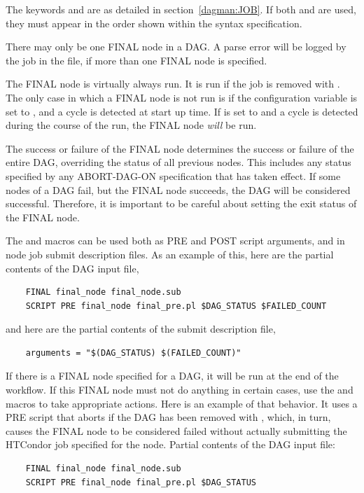 The keywords  and  
are as detailed in section~\ref{dagman:JOB}.
If both  and  are used, 
they must appear in the order shown within the syntax specification.

There may only be one FINAL node in a DAG.
A parse error will be logged by the  job in the
 file,
if more than one FINAL node is specified.

The FINAL node is virtually always run.
It is run if the  job is removed with .
The only case in which a FINAL node is not run
is if the configuration variable  
is set to ,
and a cycle is detected at start up time.
If  is set to  and
a cycle is detected during the course of the run, 
the FINAL node \emph{will} be run.

The success or failure of the FINAL node 
determines the success or failure of the entire DAG,
overriding the status of all previous nodes.
This includes any status specified by any ABORT-DAG-ON specification
that has taken effect.
If some nodes of a DAG fail,
but the FINAL node succeeds, the DAG will be considered successful.
Therefore, it is important
to be careful about setting the exit status of the FINAL node.


The  and  macros can be used both
as PRE and POST script arguments, and in node job submit description files.
As an example of this, here are the partial contents of the DAG input file,
\begin{verbatim}
    FINAL final_node final_node.sub
    SCRIPT PRE final_node final_pre.pl $DAG_STATUS $FAILED_COUNT
\end{verbatim}

and here are the partial contents of the submit description file, 
\begin{verbatim}
    arguments = "$(DAG_STATUS) $(FAILED_COUNT)"
\end{verbatim}

If there is a FINAL node specified for a DAG, 
it will be run at the end of the workflow.
If this FINAL node must not do anything in certain cases, 
use the  and 
macros to take appropriate actions.  
Here is an example of that behavior.
It uses a PRE script that aborts if the DAG has been removed with ,
which, in turn,
causes the FINAL node to be considered failed without actually submitting the
HTCondor job specified for the node.
Partial contents of the DAG input file:
\begin{verbatim}
    FINAL final_node final_node.sub
    SCRIPT PRE final_node final_pre.pl $DAG_STATUS
\end{verbatim}

